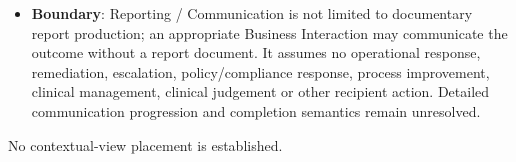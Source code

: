 \begin{itemize}
\item
\textbf{Boundary}: Reporting /\allowbreak{} Communication is not limited to documentary report production; an appropriate Business Interaction may communicate the outcome without a report document. It assumes no operational response, remediation, escalation, policy/\allowbreak{}compliance response, process improvement, clinical management, clinical judgement or other recipient action. Detailed communication progression and completion semantics remain unresolved.



\end{itemize}


No contextual-view placement is established.


